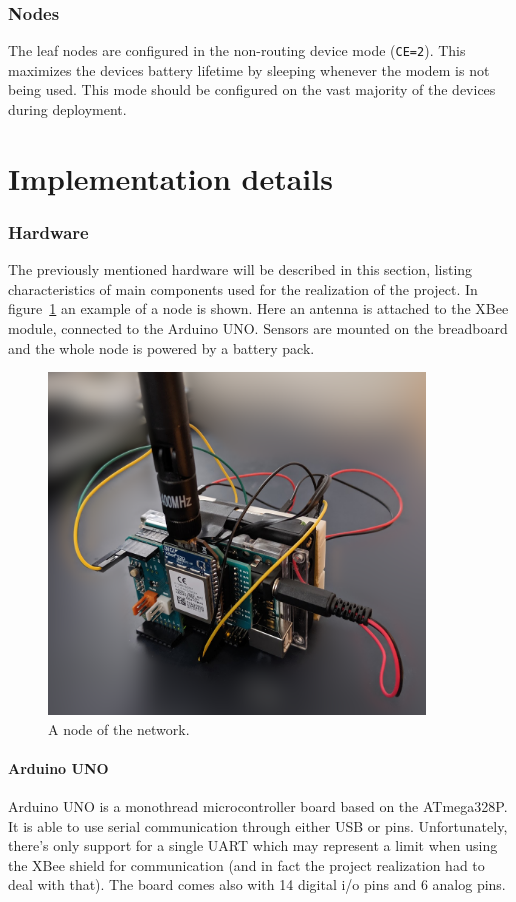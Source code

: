\documentclass[a4paper,11pt]{scrartcl}
\begin{document}
\section{Nodes}
The leaf nodes are configured in the non-routing device mode (\texttt{CE=2}). This maximizes the devices battery lifetime by sleeping whenever the modem is not being used. This mode should be configured on the vast majority of the devices during deployment.

\part{Implementation details}
\section{Hardware}
The previously mentioned hardware will be described in this section, listing characteristics of main components used for the realization of the project. In figure~\ref{fig:node} an example of a node is shown. Here an antenna is attached to the XBee module, connected to the Arduino UNO. Sensors are mounted on the breadboard and the whole node is powered by a battery pack.

\begin{figure}
    \centering
    \includegraphics[width=10cm]{hardware}
    \caption{A node of the network.}
    \label{fig:node}
\end{figure}

\subsection{Arduino UNO}
Arduino UNO is a monothread microcontroller board based on the ATmega328P. It is able to use serial communication through either USB or pins. Unfortunately, there's only support for a single UART which may represent a limit when using the XBee shield for communication (and in fact the project realization had to deal with that). The board comes also with 14 digital i/o pins and 6 analog pins.
\end{document}
